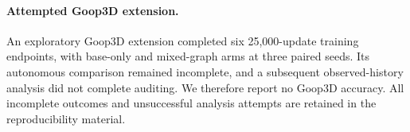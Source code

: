 \paragraph{Attempted Goop3D extension.}
An exploratory Goop3D extension completed six 25,000-update training endpoints, with base-only and mixed-graph arms at three paired seeds. Its autonomous comparison remained incomplete, and a subsequent observed-history analysis did not complete auditing. We therefore report no Goop3D accuracy. All incomplete outcomes and unsuccessful analysis attempts are retained in the reproducibility material.

